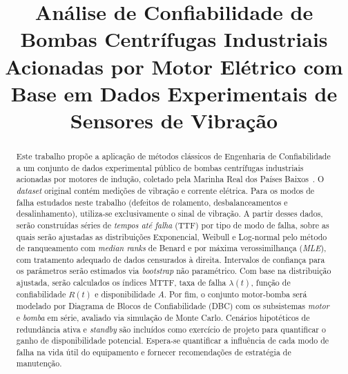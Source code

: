 \documentclass[conference]{IEEEtran}
\begin{document}
\title{Análise de Confiabilidade de Bombas Centrífugas Industriais
       Acionadas por Motor Elétrico com Base em
       Dados Experimentais de Sensores de Vibração}

\author{
\and
{}
\and
{}
}

\maketitle

\begin{abstract}
Este trabalho propõe a aplicação de métodos clássicos de Engenharia de
Confiabilidade a um conjunto de dados experimental público de bombas
centrífugas industriais acionadas por motores de indução, coletado pela
Marinha Real dos Países Baixos~\cite{bruinsma2024}. O \textit{dataset} original contém
medições de vibração e corrente elétrica. Para os modos de falha estudados neste trabalho (defeitos de rolamento, desbalanceamentos e desalinhamento), utiliza-se exclusivamente o sinal de vibração. A partir desses dados, serão construídas séries de
\textit{tempos até falha} (TTF) por tipo de modo de falha, sobre as
quais serão ajustadas as distribuições Exponencial, Weibull e
Log-normal pelo método de ranqueamento com \textit{median ranks} de
Benard e por máxima verossimilhança (\textit{MLE}), com tratamento adequado de
dados censurados à direita. Intervalos de confiança para os parâmetros
serão estimados via \textit{bootstrap} não paramétrico. Com base na
distribuição ajustada, serão calculados os índices MTTF, taxa de falha
$\lambda(t)$, função de confiabilidade $R(t)$ e disponibilidade $A$.
Por fim, o conjunto motor-bomba será modelado por Diagrama de Blocos de
Confiabilidade (DBC) com os subsistemas \textit{motor} e \textit{bomba}
em série, avaliado via simulação de Monte Carlo. Cenários hipotéticos
de redundância ativa e \textit{standby} são incluídos como exercício de
projeto para quantificar o ganho de disponibilidade potencial. Espera-se
quantificar a influência de cada modo de falha na vida útil do
equipamento e fornecer recomendações de estratégia de manutenção.
\end{abstract}
\end{document}
